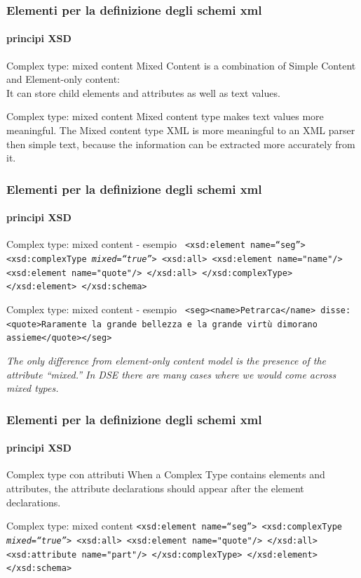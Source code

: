 \begin{frame}
	\frametitle{Elementi per la definizione degli schemi xml}
	\framesubtitle{principi XSD}
	\addtocounter{nframe}{1}

	\begin{block}{Complex type: mixed content}
		Mixed Content is a combination of Simple Content and Element-only content:
		\\ It can store child elements and attributes as well as text values.
	\end{block}

	\begin{block}{Complex type: mixed content}
		Mixed content type makes text values more meaningful. The Mixed content type XML is more meaningful to an XML parser then simple text, because the information can be extracted more accurately from it.
	\end{block}
\end{frame}

\begin{frame}
	\frametitle{Elementi per la definizione degli schemi xml}
	\framesubtitle{principi XSD}
	\addtocounter{nframe}{1}

	\begin{block}{Complex type: mixed content - esempio}
		\texttt{
			<xsd:element name=``seg''>
			<xsd:complexType \textit{mixed=``true''}>
			<xsd:all>
			<xsd:element name="name"/>
			<xsd:element name="quote"/>
			</xsd:all>
			</xsd:complexType>
			</xsd:element>
			</xsd:schema>
		}
	\end{block}

	\begin{block}{Complex type: mixed content - esempio}
		\texttt{
			<seg><name>Petrarca</name> disse: <quote>Raramente la grande bellezza e la grande virtù dimorano assieme</quote></seg>
		}
	\end{block}

	\textit{The only difference from element-only content model is the presence of the attribute ``mixed.'' In DSE there are many cases where we would come across mixed types.}
\end{frame}

\begin{frame}
	\frametitle{Elementi per la definizione degli schemi xml}
	\framesubtitle{principi XSD}
	\addtocounter{nframe}{1}

	\begin{block}{Complex type con attributi}
		When a Complex Type contains elements and attributes, the attribute declarations should appear after the element declarations.
	\end{block}

	\begin{block}{Complex type: mixed content}
		\texttt{<xsd:element name=``seg''>
			<xsd:complexType \textit{mixed=``true''}>
			<xsd:all>
			<xsd:element name="quote"/>
			</xsd:all>
			<xsd:attribute name="part"/>
			</xsd:complexType>
			</xsd:element>
			</xsd:schema>}
	\end{block}
\end{frame}


